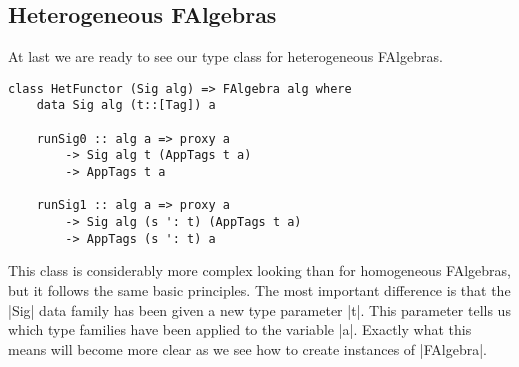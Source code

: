 \documentclass[preprint]{sigplanconf}
\theoremstyle{definition}
\begin{document}
\subsection{Heterogeneous FAlgebras}

At last we are ready to see our type class for heterogeneous FAlgebras.
\begin{lstlisting}
class HetFunctor (Sig alg) => FAlgebra alg where
    data Sig alg (t::[Tag]) a

    runSig0 :: alg a => proxy a
        -> Sig alg t (AppTags t a)
        -> AppTags t a

    runSig1 :: alg a => proxy a
        -> Sig alg (s ': t) (AppTags t a)
        -> AppTags (s ': t) a
\end{lstlisting}
This class is considerably more complex looking than for homogeneous FAlgebras,
but it follows the same basic principles.
The most important difference is that the |Sig| data family has been given a new type parameter |t|.
This parameter tells us which type families have been applied to the variable |a|.
Exactly what this means will become more clear as we see how to create instances of |FAlgebra|.
\end{document}
